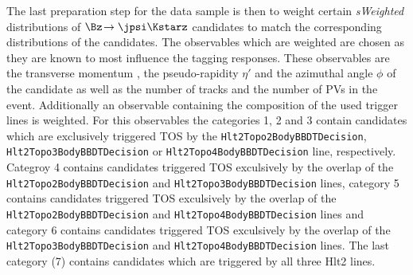 The last preparation step for the data sample is then to weight certain \emph{sWeighted} distributions of $\Bz\!\to\jpsi\Kstarz$ candidates to match the corresponding distributions of the \BdToDpi candidates.
The observables which are weighted are chosen as they are known to most influence the tagging responses.
These observables are the transverse momentum \pt, the pseudo-rapidity $\eta'$ and the azimuthal angle $\phi$ of the \Bz candidate as well as the number of tracks and the number of \ac{PV}s in the event.
Additionally an observable containing the composition of the used trigger lines is weighted.
For this observables the categories \num{1}, \num{2} and \num{3} contain candidates which are exclusively triggered TOS by the \verb!Hlt2Topo2BodyBBDTDecision!, \verb!Hlt2Topo3BodyBBDTDecision! or \verb!Hlt2Topo4BodyBBDTDecision! line, respectively.
Categroy \num{4} contains candidates triggered TOS exculsively by the overlap of the \verb!Hlt2Topo2BodyBBDTDecision! and \verb!Hlt2Topo3BodyBBDTDecision! lines, category \num{5} contains candidates triggered TOS exculsively by the overlap of the \verb!Hlt2Topo2BodyBBDTDecision! and \verb!Hlt2Topo4BodyBBDTDecision! lines and category \num{6} contains candidates triggered TOS exculsively by the overlap of the \verb!Hlt2Topo3BodyBBDTDecision! and \verb!Hlt2Topo4BodyBBDTDecision! lines.
The last category (\num{7}) contains candidates which are triggered by all three Hlt2 lines.

